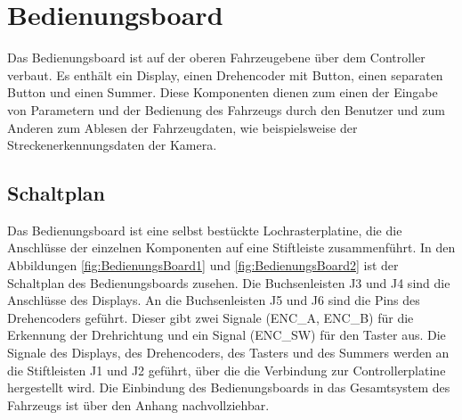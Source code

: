 

\pagestyle{fancy}
\rhead{\thepage} \chead{} 
\cfoot{}



\section{Bedienungsboard}\label{Sec6}

Das Bedienungsboard ist auf der oberen Fahrzeugebene über dem Controller verbaut. Es enthält ein Display, einen Drehencoder mit Button, einen separaten Button und einen Summer. Diese Komponenten dienen zum einen der Eingabe von Parametern und der Bedienung des Fahrzeugs durch den Benutzer und zum Anderen zum Ablesen der Fahrzeugdaten, wie beispielsweise der Streckenerkennungsdaten der Kamera.

\subsection{Schaltplan}\label{Sec6Sub1}

Das Bedienungsboard ist eine selbst bestückte Lochrasterplatine, die die Anschlüsse der einzelnen Komponenten auf eine Stiftleiste zusammenführt. In den Abbildungen \ref{fig:BedienungsBoard1} und \ref{fig:BedienungsBoard2} ist der Schaltplan des Bedienungsboards zusehen. Die Buchsenleisten J3 und J4 sind die Anschlüsse des Displays. An die Buchsenleisten J5 und J6 sind die Pins des Drehencoders geführt. Dieser gibt zwei Signale (ENC\_A, ENC\_B) für die Erkennung der Drehrichtung und ein Signal (ENC\_SW) für den Taster aus. Die Signale des Displays, des Drehencoders, des Tasters und des Summers werden an die Stiftleisten J1 und J2 geführt, über die die Verbindung zur Controllerplatine hergestellt wird. Die Einbindung des Bedienungsboards in das Gesamtsystem des Fahrzeugs ist über den Anhang \glqq{}\grqq{} nachvollziehbar.

